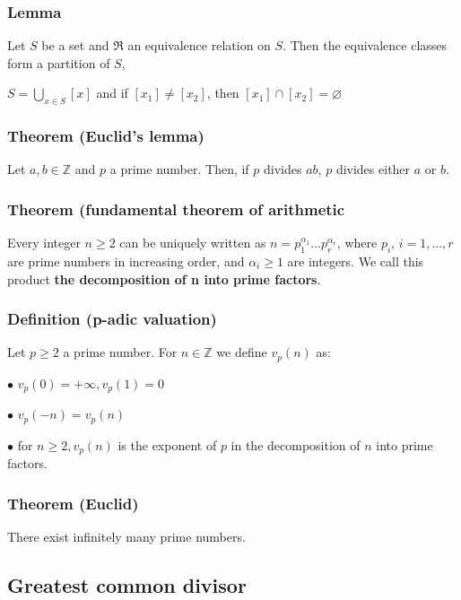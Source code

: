             \subsubsection{Lemma}
            Let $S$ be a set and $\mathfrak{R}$ an equivalence relation on $S$. Then the equivalence classes form a partition of $S$, 

            \vspace{5pt}
            \centerline{$S=\displaystyle\bigcup_{x\in S} [x]$ and if $[x_1] \neq [x_2]$, then $[x_1] \cap [x_2] = \varnothing$}

            \subsubsection{Theorem (Euclid's lemma)}
            Let $a,b\in\mathbb{Z}$ and $p$ a prime number. Then, if $p$ divides $ab$, $p$ divides either $a$ or $b$.

            \subsubsection{Theorem (fundamental theorem of arithmetic}
            Every integer $n \geq 2$ can be uniquely written as $n=p_1^{\alpha_1}...p_r^{\alpha_r}$, where $p_i$, $i=1,...,r$ are prime numbers in increasing order, and $\alpha_i \geq 1$ are integers. We call this product \textbf{the decomposition of n into prime factors}.

            \subsubsection{Definition (p-adic valuation)}
            Let $p \geq 2$ a prime number. For $n\in\mathbb{Z}$ we define $v_p(n)$ as:

            $\bullet$ $v_p(0)=+\infty, v_p(1)=0$
            
            $\bullet$ $v_p(-n)=v_p(n)$
            
            $\bullet$ for $n\geq 2, v_p(n)$ is the exponent of $p$ in the decomposition of $n$ into prime factors.

            \subsubsection{Theorem (Euclid)}
            There exist infinitely many prime numbers.

            \subsection{Greatest common divisor}
